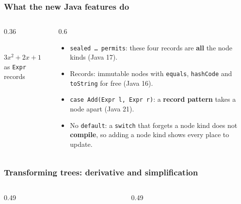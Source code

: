 \documentclass[aspectratio=169,10pt,compress]{beamer}
\begin{document}
\begin{frame}[t,fragile] \frametitle{What the new Java features do}
  \begin{columns}[T]
    \begin{column}{0.36\textwidth}
      \begin{center}
      \\
      \small $3x^{2} + 2x + 1$ as \texttt{Expr} records
      \end{center}
    \end{column}
    \begin{column}{0.6\textwidth}
      \begin{itemize}\small
        \item \texttt{sealed \dots{} permits}: these four records are \textbf{all} the node kinds (Java 17).
        \item Records: immutable nodes with \texttt{equals}, \texttt{hashCode} and \texttt{toString} for free (Java 16).
        \item \texttt{case Add(Expr l, Expr r)}: a \textbf{record pattern} takes a node apart (Java 21).
        \item No \texttt{default}: a \texttt{switch} that forgets a node kind does not \textbf{compile}, so adding a node kind shows every place to update.
      \end{itemize}
    \end{column}
  \end{columns}
\end{frame}




\begin{frame}[t,fragile] \frametitle{Transforming trees: derivative and simplification}
  \begin{columns}[T]
    \begin{column}{0.49\textwidth}
    \end{column}
    \begin{column}{0.49\textwidth}
    \end{column}
  \end{columns}
\end{frame}
\end{document}
